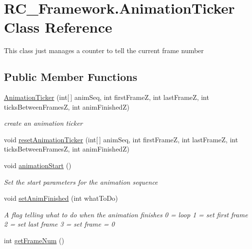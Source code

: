 \hypertarget{class_r_c___framework_1_1_animation_ticker}{}\section{R\+C\+\_\+\+Framework.\+Animation\+Ticker Class Reference}
\label{class_r_c___framework_1_1_animation_ticker}


This class just manages a counter to tell the current frame number  


\subsection*{Public Member Functions}
\begin{DoxyCompactItemize}
\item 
\mbox{\hyperlink{class_r_c___framework_1_1_animation_ticker_afb68bed1e4614d31fea99971448af72b}{Animation\+Ticker}} (int\mbox{[}$\,$\mbox{]} anim\+Seq, int first\+FrameZ, int last\+FrameZ, int ticks\+Between\+FramesZ, int anim\+FinishedZ)
\begin{DoxyCompactList}\small\item\em create an animation ticker \end{DoxyCompactList}\item 
void \mbox{\hyperlink{class_r_c___framework_1_1_animation_ticker_a7dc8c7e1833acf289c4ae2d8ef7186c0}{reset\+Animation\+Ticker}} (int\mbox{[}$\,$\mbox{]} anim\+Seq, int first\+FrameZ, int last\+FrameZ, int ticks\+Between\+FramesZ, int anim\+FinishedZ)
\item 
void \mbox{\hyperlink{class_r_c___framework_1_1_animation_ticker_aa01c754af9f362a118156f5114ee8843}{animation\+Start}} ()
\begin{DoxyCompactList}\small\item\em Set the start parameters for the animation sequence \end{DoxyCompactList}\item 
void \mbox{\hyperlink{class_r_c___framework_1_1_animation_ticker_a745c0ec1e44580c17ce60646ba0a8c10}{set\+Anim\+Finished}} (int what\+To\+Do)
\begin{DoxyCompactList}\small\item\em A flag telling what to do when the animation finishes 0 = loop 1 = set first frame 2 = set last frame 3 = set frame = 0 \end{DoxyCompactList}\item 
int \mbox{\hyperlink{class_r_c___framework_1_1_animation_ticker_a5f122a2978abcd1ae930d22fbbf6e07e}{get\+Frame\+Num}} ()

\end{DoxyCompactItemize}
